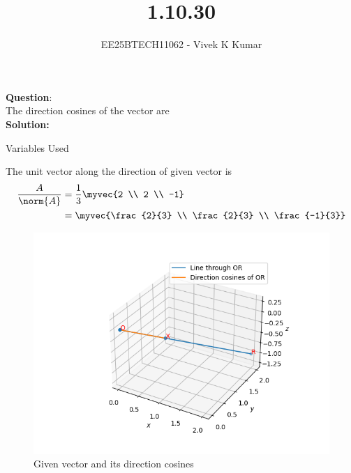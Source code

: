 \documentclass[journal]{IEEEtran}
\title{1.10.30}
\author{EE25BTECH11062 - Vivek K Kumar}
\begin{document}
\maketitle

\renewcommand{\thefigure}{\theenumi}
\renewcommand{\thetable}{\theenumi}


\textbf{Question}:\\
The direction cosines of the vector  are \underline{\hspace{0.1\columnwidth}}
\\
\textbf{Solution: }
\begin{table}[H]    
  \centering
  
  \caption{Variables Used}
  \label{tab:1.10.30}
\end{table}
The unit vector along the direction of given vector is\\
\begin{align}
\frac{A}{\norm{A}} &= \frac{1}{3}\myvec{2 \\ 2 \\ -1} \\
 &=\myvec{\frac{2}{3} \\ \frac{2}{3} \\ \frac{-1}{3}}
\end{align}
\begin{figure}[H]
   \centering
  \includegraphics[width=0.64\columnwidth]{figs/fig.png}
   \caption{Given vector and its direction cosines}
   \label{stemplot}
\end{figure}
\end{document}
